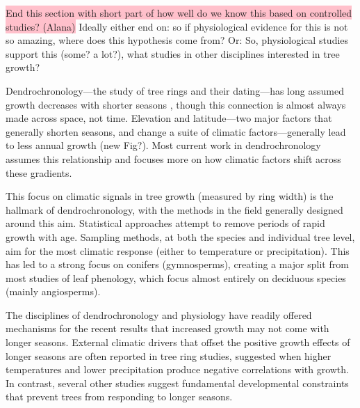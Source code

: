 \documentclass[11pt]{article}
\begin{document}
\colorbox{pink}{End this section with short part of how well do we know this based on controlled studies? (Alana)} Ideally either end on: so if physiological evidence for this is not so amazing, where does this hypothesis come from? Or: So, physiological studies support this (some? a lot?), what studies in other disciplines interested in tree growth?

Dendrochronology---the study of tree rings and their dating---has long assumed growth decreases with shorter seasons \citep[e.g.,][]{bruening2017}, though this connection is almost always made across space, not time. Elevation and latitude---two major factors that generally shorten seasons, and change a suite of climatic factors---generally lead to less annual growth (new Fig?). Most current work in dendrochronology assumes this relationship and focuses more on how climatic factors shift across these gradients. 

This focus on climatic signals in tree growth (measured by ring width) is the hallmark of dendrochronology, with the methods in the field generally designed around this aim. Statistical approaches attempt to remove periods of rapid growth with age. Sampling methods, at both the species and individual tree level, aim for the most climatic response (either to temperature or precipitation). This has led to a strong focus on conifers (gymnosperms), creating a major split from most studies of leaf phenology, which focus almost entirely on deciduous species (mainly angiosperms).

The disciplines of dendrochronology and physiology have readily offered mechanisms for the recent results that increased growth may not come with longer seasons. External climatic drivers that offset the positive growth effects of longer seasons are often reported in tree ring studies, suggested when higher temperatures and lower precipitation produce negative correlations with growth. In contrast, several other studies suggest fundamental developmental constraints that prevent trees from responding to longer seasons. 
\end{document}
